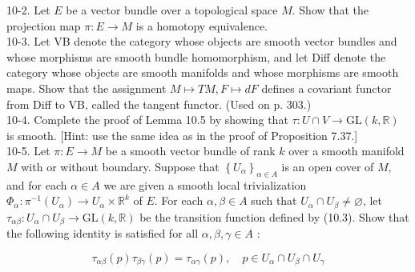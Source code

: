 \documentclass[10pt]{article}
\begin{document}
10-2. Let $E$ be a vector bundle over a topological space $M$. Show that the projection map $\pi: E \rightarrow M$ is a homotopy equivalence.\\
10-3. Let VB denote the category whose objects are smooth vector bundles and whose morphisms are smooth bundle homomorphism, and let Diff denote the category whose objects are smooth manifolds and whose morphisms are smooth maps. Show that the assignment $M \mapsto T M, F \mapsto d F$ defines a covariant functor from Diff to VB, called the tangent functor. (Used on p. 303.)\\
10-4. Complete the proof of Lemma 10.5 by showing that $\tau: U \cap V \rightarrow \mathrm{GL}(k, \mathbb{R})$ is smooth. [Hint: use the same idea as in the proof of Proposition 7.37.]\\
10-5. Let $\pi: E \rightarrow M$ be a smooth vector bundle of rank $k$ over a smooth manifold $M$ with or without boundary. Suppose that $\left\{U_{\alpha}\right\}_{\alpha \in A}$ is an open cover of $M$, and for each $\alpha \in A$ we are given a smooth local trivialization $\Phi_{\alpha}: \pi^{-1}\left(U_{\alpha}\right) \rightarrow U_{\alpha} \times \mathbb{R}^{k}$ of $E$. For each $\alpha, \beta \in A$ such that $U_{\alpha} \cap U_{\beta} \neq \varnothing$, let $\tau_{\alpha \beta}: U_{\alpha} \cap U_{\beta} \rightarrow \mathrm{GL}(k, \mathbb{R})$ be the transition function defined by (10.3). Show that the following identity is satisfied for all $\alpha, \beta, \gamma \in A$ :

$$
\tau_{\alpha \beta}(p) \tau_{\beta \gamma}(p)=\tau_{\alpha \gamma}(p), \quad p \in U_{\alpha} \cap U_{\beta} \cap U_{\gamma}
$$
\end{document}
